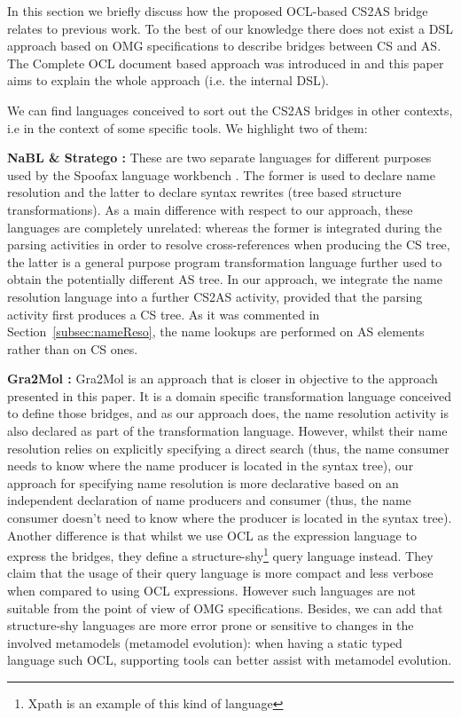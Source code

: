\documentclass{llncs}
\begin{document}
In this section we briefly discuss how the proposed OCL-based CS2AS bridge relates to previous work. To the best of our knowledge there does not exist a DSL approach based on OMG specifications to describe bridges between CS and AS. The Complete OCL document based approach was introduced in \cite{sanchez2014enhancingXtext} and this paper aims to explain the whole approach (i.e. the internal DSL).

We can find languages conceived to sort out the CS2AS bridges in other contexts, i.e in the context of some specific tools. %
We highlight two of them:

\textbf{NaBL \cite{konat2013decNameRes} \& Stratego \cite{visser2004stratego}:} These are two separate languages for different purposes used by the Spoofax language workbench \cite{spoofaxOnline}. The former is used to declare name resolution and the latter to declare syntax rewrites (tree based structure transformations). As a main difference with respect to our approach, these languages are completely unrelated: whereas the former is integrated during the parsing activities in order to resolve cross-references when producing the CS tree, the latter is a general purpose program transformation language further used to obtain the potentially different AS tree. In our approach, we integrate the name resolution language into a further CS2AS activity, provided that the parsing activity first produces a CS tree. As it was commented in Section~\ref{subsec:nameReso}, the name lookups are performed on AS elements rather than on CS ones.

\textbf{Gra2Mol \cite{canovas2012gra2mol}:}  Gra2Mol is an approach that is closer in objective to the approach presented in this paper. It is a domain specific transformation language conceived to define those bridges, and as our approach does, the name resolution activity is also declared as part of the transformation language. However, whilst their name resolution relies on explicitly specifying a direct search (thus, the name consumer needs to know where the name producer is located in the syntax tree), our approach for specifying name resolution is more declarative based on an independent declaration of name producers and consumer (thus, the name consumer doesn't need to know where the producer is located in the syntax tree). Another difference is that whilst we use OCL as the expression language to express the bridges, they define a structure-shy\footnote{Xpath is an example of this kind of language} query language instead. They claim that the usage of their query language is more compact and less verbose when compared to using OCL expressions. However such languages are not suitable from the point of view of OMG specifications. Besides, we can add that structure-shy languages are more error prone or sensitive to changes in the involved metamodels (metamodel evolution): when having a static typed language such OCL, supporting tools can better assist with metamodel evolution.
\end{document}
